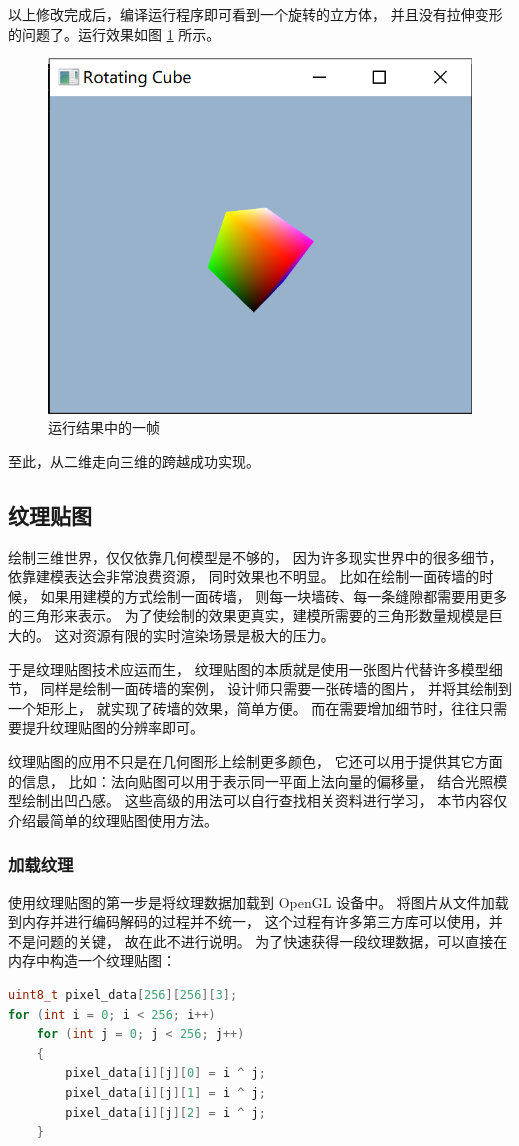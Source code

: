 \documentclass[fontset=windows]{ctexart}
\begin{document}
以上修改完成后，编译运行程序即可看到一个旋转的立方体，
并且没有拉伸变形的问题了。运行效果如图 \ref{fig-gl:rotating-cube} 所示。

\begin{figure}
\centering
\includegraphics[width=0.5\linewidth]{imgs/sec 4.7/rotating-cube.png}
\caption{运行结果中的一帧}
\label{fig-gl:rotating-cube}
\end{figure}

至此，从二维走向三维的跨越成功实现。


\subsection{纹理贴图}

绘制三维世界，仅仅依靠几何模型是不够的，
因为许多现实世界中的很多细节，依靠建模表达会非常浪费资源，
同时效果也不明显。
比如在绘制一面砖墙的时候，
如果用建模的方式绘制一面砖墙，
则每一块墙砖、每一条缝隙都需要用更多的三角形来表示。
为了使绘制的效果更真实，建模所需要的三角形数量规模是巨大的。
这对资源有限的实时渲染场景是极大的压力。

于是纹理贴图技术应运而生，
纹理贴图的本质就是使用一张图片代替许多模型细节，
同样是绘制一面砖墙的案例，
设计师只需要一张砖墙的图片，
并将其绘制到一个矩形上，
就实现了砖墙的效果，简单方便。
而在需要增加细节时，往往只需要提升纹理贴图的分辨率即可。

纹理贴图的应用不只是在几何图形上绘制更多颜色，
它还可以用于提供其它方面的信息，
比如：法向贴图可以用于表示同一平面上法向量的偏移量，
结合光照模型绘制出凹凸感。
这些高级的用法可以自行查找相关资料进行学习，
本节内容仅介绍最简单的纹理贴图使用方法。

\subsubsection{加载纹理}

使用纹理贴图的第一步是将纹理数据加载到 OpenGL 设备中。
将图片从文件加载到内存并进行编码解码的过程并不统一，
这个过程有许多第三方库可以使用，并不是问题的关键，
故在此不进行说明。
为了快速获得一段纹理数据，可以直接在内存中构造一个纹理贴图：
\begin{lstlisting}[language=c++]
uint8_t pixel_data[256][256][3];
for (int i = 0; i < 256; i++)
    for (int j = 0; j < 256; j++)
    {
        pixel_data[i][j][0] = i ^ j;
        pixel_data[i][j][1] = i ^ j;
        pixel_data[i][j][2] = i ^ j;
    }
\end{lstlisting}
\end{document}
